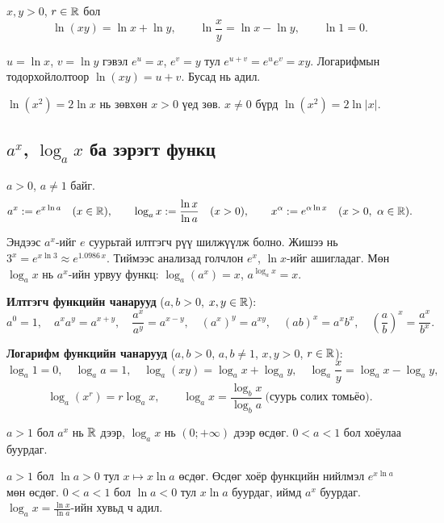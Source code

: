 \begin{theorem}
$x,y>0$, $r\in\mathbb{R}$ бол
\[
\ln(xy)=\ln x+\ln y,\qquad \ln\frac{x}{y}=\ln x-\ln y,\qquad \ln 1=0.
\]
\end{theorem}
\begin{prof}
$u=\ln x$, $v=\ln y$ гэвэл $e^u=x$, $e^v=y$ тул $e^{u+v}=e^ue^v=xy$. Логарифмын
тодорхойлолтоор $\ln(xy)=u+v$. Бусад нь адил.
\end{prof}

\begin{remark}
$\ln(x^2)=2\ln x$ нь зөвхөн $x>0$ үед зөв. $x\neq0$ бүрд $\ln(x^2)=2\ln|x|$.
\end{remark}

\subsection{$a^x$, $\log_a x$ ба зэрэгт функц}
\begin{definition}
$a>0$, $a\neq1$ байг.
\[
a^x:=e^{x\ln a}\quad(x\in\mathbb{R}),\qquad
\log_a x:=\frac{\ln x}{\ln a}\quad(x>0),\qquad
x^\alpha:=e^{\alpha\ln x}\quad(x>0,\ \alpha\in\mathbb{R}).
\]
\end{definition}

\begin{remark}
Эндээс $a^x$-ийг $e$ суурьтай илтгэгч рүү шилжүүлж болно. Жишээ нь
$3^x=e^{x\ln3}\approx e^{1.0986\,x}$. Тиймээс анализад голчлон $e^x$, $\ln x$-ийг ашигладаг.
Мөн $\log_a x$ нь $a^x$-ийн урвуу функц: $\log_a(a^x)=x$, \; $a^{\log_a x}=x$.
\end{remark}

\textbf{Илтгэгч функцийн чанарууд} ($a,b>0$, $x,y\in\mathbb{R}$):
\[
a^0=1,\quad a^xa^y=a^{x+y},\quad \frac{a^x}{a^y}=a^{x-y},\quad (a^x)^y=a^{xy},\quad
(ab)^x=a^xb^x,\quad \left(\frac ab\right)^x=\frac{a^x}{b^x}.
\]

\textbf{Логарифм функцийн чанарууд} ($a,b>0$, $a,b\neq1$, $x,y>0$, $r\in\mathbb{R}$):
\[
\log_a1=0,\quad \log_aa=1,\quad \log_a(xy)=\log_ax+\log_ay,\quad
\log_a\frac xy=\log_ax-\log_ay,
\]
\[
\log_a(x^r)=r\log_ax,\qquad \log_ax=\frac{\log_bx}{\log_ba}\ \text{(суурь солих томьёо)}.
\]

\begin{theorem}
$a>1$ бол $a^x$ нь $\mathbb{R}$ дээр, $\log_ax$ нь $(0;+\infty)$ дээр өсдөг.
$0<a<1$ бол хоёулаа буурдаг.
\end{theorem}
\begin{prof}
$a>1$ бол $\ln a>0$ тул $x\mapsto x\ln a$ өсдөг. Өсдөг хоёр функцийн нийлмэл
$e^{x\ln a}$ мөн өсдөг. $0<a<1$ бол $\ln a<0$ тул $x\ln a$ буурдаг, иймд $a^x$ буурдаг.
$\log_ax=\frac{\ln x}{\ln a}$-ийн хувьд ч адил.
\end{prof}

